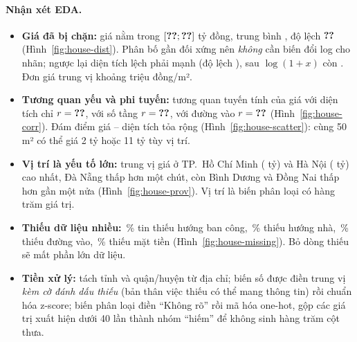 

\paragraph{Nhận xét EDA.}
\begin{itemize}
  \item \textbf{Giá đã bị chặn:} giá nằm trong $[\SL{eda/house/price_min}; \SL{eda/house/price_max}]$ tỷ đồng, trung bình
    , độ lệch $\SL{eda/house/price_skew}$ (Hình~\ref{fig:house-dist}). Phân bố gần đối xứng nên
    \emph{không} cần biến đổi log cho nhãn; ngược lại diện tích lệch phải mạnh (độ lệch ), sau
    $\log(1 + x)$ còn . Đơn giá trung vị khoảng  triệu đồng/m².
  \item \textbf{Tương quan yếu và phi tuyến:} tương quan tuyến tính của giá với diện tích chỉ $r = \SL{eda/house/corr_area}$,
    với số tầng $r = \SL{eda/house/corr_floors}$, với đường vào $r = \SL{eda/house/corr_road}$ (Hình~\ref{fig:house-corr}).
    Đám điểm giá -- diện tích tỏa rộng (Hình~\ref{fig:house-scatter}): cùng 50 m² có thể giá 2 tỷ hoặc 11 tỷ tùy vị trí.
  \item \textbf{Vị trí là yếu tố lớn:} trung vị giá ở TP.~Hồ Chí Minh ( tỷ) và Hà
    Nội ( tỷ) cao nhất, Đà Nẵng thấp hơn một chút, còn Bình Dương và Đồng Nai thấp hơn gần
    một nửa (Hình~\ref{fig:house-prov}). Vị trí là biến phân loại có hàng trăm giá trị.
  \item \textbf{Thiếu dữ liệu nhiều:} \,\% tin thiếu hướng ban công,
    \,\% thiếu hướng nhà, \,\% thiếu đường vào,
    \,\% thiếu mặt tiền (Hình~\ref{fig:house-missing}). Bỏ dòng thiếu sẽ mất phần lớn dữ liệu.
  \item \textbf{Tiền xử lý:} tách tỉnh và quận/huyện từ địa chỉ; biến số được điền trung vị \emph{kèm cờ đánh dấu thiếu} (bản
    thân việc thiếu có thể mang thông tin) rồi chuẩn hóa z-score; biến phân loại điền “Không rõ” rồi mã hóa one-hot, gộp các
    giá trị xuất hiện dưới 40 lần thành nhóm “hiếm” để không sinh hàng trăm cột thưa.
\end{itemize}

